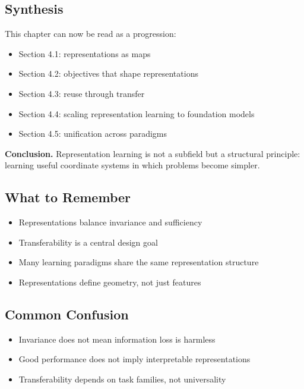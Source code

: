 \subsection{Synthesis}

This chapter can now be read as a progression:

\begin{itemize}
\item Section 4.1: representations as maps
\item Section 4.2: objectives that shape representations
\item Section 4.3: reuse through transfer
\item Section 4.4: scaling representation learning to foundation models
\item Section 4.5: unification across paradigms
\end{itemize}

\medskip

\noindent
\textbf{Conclusion.}  
Representation learning is not a subfield but a structural principle:  
learning useful coordinate systems in which problems become simpler.

\subsection{What to Remember}

\begin{itemize}
\item Representations balance invariance and sufficiency
\item Transferability is a central design goal
\item Many learning paradigms share the same representation structure
\item Representations define geometry, not just features
\end{itemize}

\subsection{Common Confusion}

\begin{itemize}
\item Invariance does not mean information loss is harmless
\item Good performance does not imply interpretable representations
\item Transferability depends on task families, not universality
\end{itemize}

